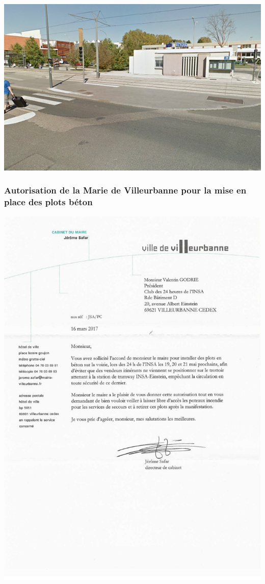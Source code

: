 \documentclass[hidelinks, paper=a4, fontsize=13pt]{report}
\begin{document}
\begin{center}
	\includegraphics[scale=0.7]{Annexes/Images/zoneARisque4}
\end{center}
\subsubsection{Autorisation de la Marie de Villeurbanne pour la mise en place des plots béton}
\begin{center}
	\includegraphics[page=1,scale=0.7]{Annexes/Documents/AutorisationMunicipalePlotsBeton}
	\label{refVentGS}
\end{center}
\end{document}
